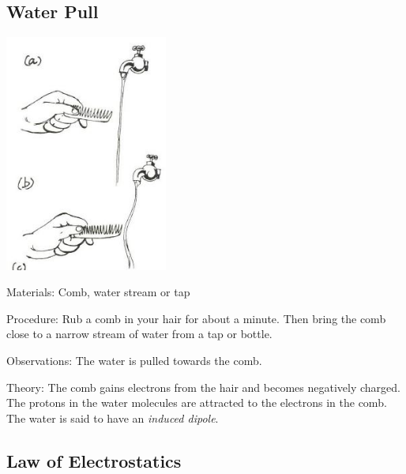 \begin{multicols}{2}
\subsection{Water Pull}

\begin{center}
\includegraphics[width=0.4\textwidth]{./img/source/comb-water.jpg}
\end{center}

\begin{description*}
\item[Materials:]{Comb, water stream or tap}
\item[Procedure:]{Rub a comb in your hair for about a minute. Then bring the comb close to a narrow stream of water from a tap or bottle.}
\item[Observations:]{The water is pulled towards the comb.}
\item[Theory:]{The comb gains electrons from the hair and becomes negatively charged. The protons in the water molecules are attracted to the electrons in the comb. The water is said to have an \emph{induced dipole}.}
\end{description*}

\subsection{Law of Electrostatics}


\end{multicols}
